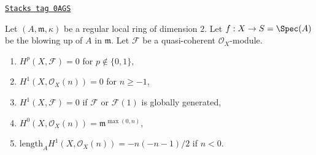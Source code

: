 \begin{lemma}
\label{resolve-lemma-cohomology-of-blowup}
\href{https://stacks.math.columbia.edu/tag/0AGS}{\texttt{Stacks tag 0AGS}}

Let $(A, \mathfrak m, \kappa)$ be a regular local ring of dimension $2$.
Let $f : X \to S = \Spec(A)$ be the blowing up of $A$ in $\mathfrak m$.
Let $\mathcal{F}$ be a quasi-coherent $\mathcal{O}_X$-module.
\begin{enumerate}
\item $H^p(X, \mathcal{F}) = 0$ for $p \not \in \{0, 1\}$,
\item $H^1(X, \mathcal{O}_X(n)) = 0$ for $n \geq -1$,
\item $H^1(X, \mathcal{F}) = 0$ if $\mathcal{F}$ or $\mathcal{F}(1)$
is globally generated,
\item $H^0(X, \mathcal{O}_X(n)) = \mathfrak m^{\max(0, n)}$,
\item $\text{length}_A H^1(X, \mathcal{O}_X(n)) = -n(-n - 1)/2$
if $n < 0$.
\end{enumerate}
\end{lemma}

